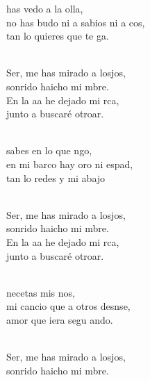 \documentclass[12pt]{article}
\begin{document}
\begin{multicols*}{2}
\begin{cancion}%
	 has vedo a la olla, \\
	no has budo ni a sabios ni a cos,\\
	tan lo quieres que  te ga.\\\jump\\
	\begin{chorus}%
	Ser, me has mirado a losjos,\\
	sonrido haicho mi mbre.\\
	En la aa he dejado mi rca,\\
	junto a  buscaré otroar.\\
	\end{chorus}%
	\jump\\
	 sabes en lo que ngo, \\
	en mi barco hay oro ni espad,\\
	tan lo redes y mi abajo\\\jump\\
	\begin{chorus}%
	Ser, me has mirado a losjos,\\
	sonrido haicho mi mbre.\\
	En la aa he dejado mi rca,\\
	junto a  buscaré otroar.\\
	\end{chorus}%
	\jump\\
	 necetas mis nos, \\
	mi cancio que a otros desnse,\\
	amor que iera segu ando.\\\jump\\
	\begin{chorus}%
	Ser, me has mirado a losjos,\\
	sonrido haicho mi mbre.\\

\end{chorus}
\end{cancion}
\end{multicols*}
\end{document}
